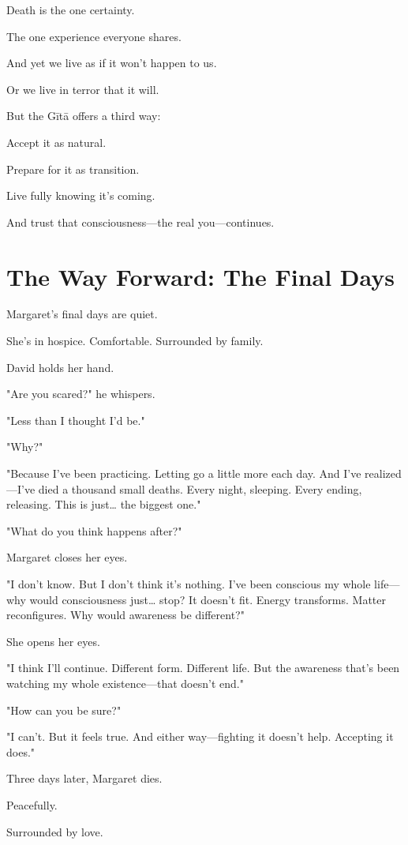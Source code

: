 \documentclass[11pt,twoside]{book}
\begin{document}
Death is the one certainty.

The one experience everyone shares.

And yet we live as if it won't happen to us.

Or we live in terror that it will.

But the Gītā offers a third way:

Accept it as natural.

Prepare for it as transition.

Live fully knowing it's coming.

And trust that consciousness—the real you—continues.

\section*{The Way Forward: The Final Days}

Margaret's final days are quiet.

She's in hospice. Comfortable. Surrounded by family.

David holds her hand.

"Are you scared?" he whispers.

"Less than I thought I'd be."

"Why?"

"Because I've been practicing. Letting go a little more each day. And I've realized—I've died a thousand small deaths. Every night, sleeping. Every ending, releasing. This is just\ldots{} the biggest one."

"What do you think happens after?"

Margaret closes her eyes.

"I don't know. But I don't think it's nothing. I've been conscious my whole life—why would consciousness just\ldots{} stop? It doesn't fit. Energy transforms. Matter reconfigures. Why would awareness be different?"

She opens her eyes.

"I think I'll continue. Different form. Different life. But the awareness that's been watching my whole existence—that doesn't end."

"How can you be sure?"

"I can't. But it feels true. And either way—fighting it doesn't help. Accepting it does."

Three days later, Margaret dies.

Peacefully.

Surrounded by love.
\end{document}
